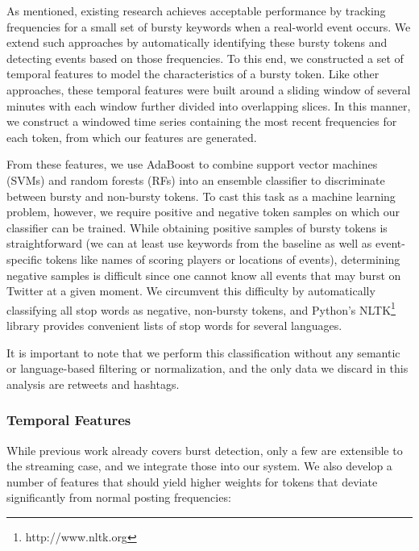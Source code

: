 \documentclass{sig-alternate}
\begin{document}
As mentioned, existing research achieves acceptable performance by tracking frequencies for a small set of bursty keywords when a real-world event occurs.
We extend such approaches by automatically identifying these bursty tokens and detecting events based on those frequencies.
To this end, we constructed a set of temporal features to model the characteristics of a bursty token.
Like other approaches, these temporal features were built around a sliding window of several minutes with each window further divided into overlapping slices. %
In this manner, we construct a windowed time series containing the most recent frequencies for each token, from which our features are generated.


From these features, we use AdaBoost to combine support vector machines (SVMs) and random forests (RFs) into an ensemble classifier to discriminate between bursty and non-bursty tokens.
To cast this task as a machine learning problem, however, we require positive and negative token samples on which our classifier can be trained.
While obtaining positive samples of bursty tokens is straightforward (we can at least use keywords from the baseline as well as event-specific tokens like names of scoring players or locations of events), determining negative samples is difficult since one cannot know all events that may burst on Twitter at a given moment.
We circumvent this difficulty by automatically classifying all stop words as negative, non-bursty tokens, and Python's NLTK\footnote{http://www.nltk.org} library provides convenient lists of stop words for several languages.

It is important to note that we perform this classification without any semantic or language-based filtering or normalization, and the only data we discard in this analysis are retweets and hashtags.

\subsubsection{Temporal Features}

While previous work already covers burst detection, only a few are extensible to the streaming case, and we integrate those into our system.
We also develop a number of features that should yield higher weights for tokens that deviate significantly from normal posting frequencies:
\end{document}
